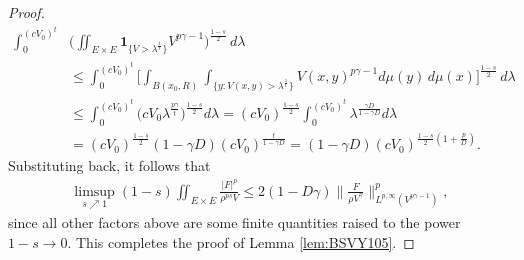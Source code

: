 \documentclass[10pt,a4paper]{amsart}
\newcommand{\BNorm}[2]{\Big\|#1\Big\|_{#2}}
\begin{document}
\begin{proof}
\begin{equation*}
\begin{split}
  \int_0^{(cV_0)^t} &\Big(\iint_{E\times E} \mathbf{1}_{\{V>\lambda^{\frac 1t}\}}
  V^{p\gamma-1}\Big)^{\frac{1-s}{2}}\,d\lambda   \\
  &\leq \int_0^{(cV_0)^t} \Big[\int_{B(x_0,R)}\int_{\{y:V(x,y)>\lambda^{\frac 1t}\}}
  V(x,y)^{p\gamma-1}d\mu(y)\,d\mu(x)
  \Big]^{\frac{1-s}{2}}\,d\lambda   \\
  &\leq \int_0^{(cV_0)^t} \big( cV_0
  \lambda^{\frac{p\gamma}{t}}\big)^{\frac{1-s}{2}}d\lambda
  = (cV_0)^{\frac{1-s}{2}} \int_0^{(cV_0)^t} \lambda^{\frac{\gamma D}{1-\gamma D}}d\lambda
  \\
  &=(cV_0)^{\frac{1-s}{2}}(1-\gamma D)(cV_0)^{\frac{t}{1-\gamma D}}
 =(1-\gamma D)(cV_0)^{\frac{1-s}{2}(1+\frac{p}{D})}.
\end{split}
\end{equation*}
Substituting back, it follows that
\begin{align*}
\limsup_{s\nearrow 1}(1-s)\iint_{E\times E}
     \frac{|F|^p}{\rho^{ps}V}
   \leq2(1-D\gamma)\BNorm{\frac{F}{\rho V^\gamma}}{
L^{p,\infty} (V^{p\gamma-1})}^p,
\end{align*}
since all other factors above are some finite quantities raised to the power $1-s\to 0$.
This completes the proof of Lemma \ref{lem:BSVY105}.
\end{proof}
\end{document}

